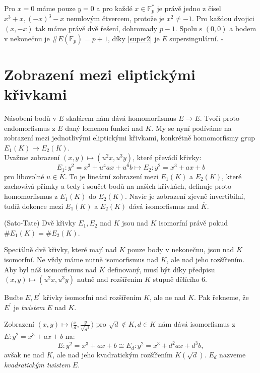 \documentclass [12pt]{report}
\begin{document}
Pro $x= 0$ máme pouze $y = 0$ a pro každé $x \in \mathbb{F}_p^*$ je právě jedno z čísel $x^3+x, (-x)^3-x$ nenulovým čtvercem, protože je $x^2 \neq -1$. Pro každou dvojici $(x,-x)$ tak máme právě dvě řešení, dohromady $p-1$. Spolu s $(0,0)$ a bodem v nekonečnu je $\# E(\mathbb{F}_p) = p+1$, díky \eqref{super2} je $E$ supersingulární. \hfill $\square$



\section{Zobrazení mezi eliptickými křivkami}

Násobení bodů v $E$ skalárem nám dává homomorfismus $E \longrightarrow E$. Tvoří proto endomorfismus z $E$ daný lomenou funkcí nad $K$. My se nyní podíváme na zobrazení mezi jednotlivými eliptickými křivkami, konkrétně homomorfismy grup $E_1(K) \longrightarrow E_2(K)$.\\

Uvažme zobrazení $(x,y) \mapsto (u^2 x, u^3 y)$, které převádí křivky:
\begin{equation*}
E_1 : y^2 = x^3 + u^4 a x + u^6 b \mapsto E_2 :  y^2 = x^3 + ax + b 
\end{equation*}
pro libovolné $u \in \overline{K}$. To je lineární zobrazení mezi $E_1(K)$ a $E_2(K)$, které zachovává přímky a tedy i součet bodů na našich křivkách, definuje proto homomorfismus z $E_1(K)$ do $E_2(K)$. Navíc je zobrazení zjevně invertibilní, tudíž dokonce mezi $E_1(K)$ a $E_2(K)$ dává isomorfismus nad $\overline{K}$.

\begin{veta} (Sato-Tate)
Dvě křivky $E_1,E_2$ nad $K$ jsou nad $K$ isomorfní právě pokud $\# E_1(K) = \# E_2(K)$.
\end{veta}

Speciálně dvě křivky, které mají nad $K$ pouze body v nekonečnu, jsou nad $K$ isomorfní. Ne vždy máme nutně isomorfismus nad $K$, ale nad jeho rozšířením. Aby byl náš isomorfismus nad $\overline{K}$ definovaný, musí být díky předpisu $(x,y) \mapsto (u^2 x, u^3 y)$ nutně nad rozšířením $K$ stupně dělícího $6$.
\begin{definice}
Buďte $E,E^\prime$ křivky isomorfní nad rozšířením $K$, ale ne nad $K$. Pak řekneme, že $E^\prime$ je \textit{twistem} $E$ nad $K$.
\end{definice}
Zobrazení $(x,y) \mapsto \big(\frac{x}{d}, \frac{y}{\sqrt{d^3}}\big) $ pro $\sqrt{d} \not \in K, d \in K$ nám dává isomorfismus z  $E:  y^2 = x^3 + ax + b$ na:
\begin{equation*}
E:  y^2 = x^3 + ax + b \cong E_d : y^2 = x^3 + d^2 a x + d^3 b,
\end{equation*}
avšak ne nad $K$, ale nad jeho kvadratickým rozšířením $K(\sqrt{d})$. $E_d$ nazveme \textit{kvadratickým twistem} $E$.\\
\end{document}

